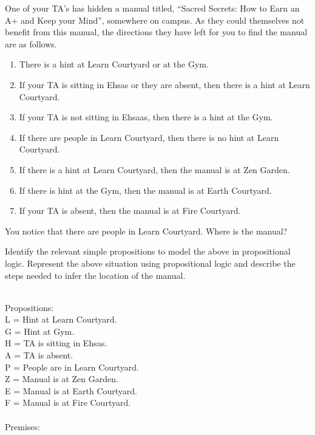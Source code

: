 \documentclass[addpoints]{exam}
\begin{document}
\begin{questions}
\question[5] One of your TA's has hidden a manual titled, ``Sacred Secrets: How to Earn an A+ and Keep your Mind'', somewhere on campus. As they could themselves not benefit from this manual, the directions they have left for you to find the manual are as follows.
  \begin{enumerate}
  \item There is a hint at Learn Courtyard or at the Gym.
  \item If your TA is sitting in Ehsas or they are absent, then there is a hint at Learn Courtyard.
  \item If your TA is not sitting in Ehsaas, then there is a hint at the Gym.
  \item If there are people in Learn Courtyard, then there is no hint at Learn Courtyard.
  \item If there is a hint at Learn Courtyard, then the manual is at Zen Garden.
  \item If there is hint at the Gym, then the manual is at Earth Courtyard.
  \item If your TA is absent, then the manual is at Fire Courtyard.
  \end{enumerate}
  You notice that there are people in Learn Courtyard. Where is the manual?

  Identify the relevant simple propositions to model the above in propositional logic. Represent the above situation using propositional logic and describe the steps needed to infer the location of the manual.
  \begin{solution}\\
    Propositions:\\
    L = Hint at Learn Courtyard.\\
    G = Hint at Gym.\\
    H = TA is sitting in Ehsas.\\
    A = TA is absent.\\
    P = People are in Learn Courtyard.\\
    Z = Manual is at Zen Garden.\\
    E = Manual is at Earth Courtyard.\\
    F = Manual is at Fire Courtyard.\\\\

    \newpage
    Premises:


\end{solution}
\end{questions}
\end{document}

